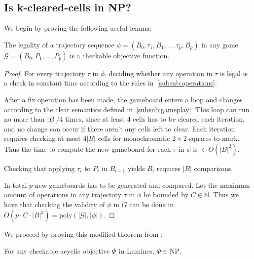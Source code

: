 \subsection{Is k-cleared-cells in NP?}

We begin by proving the following useful lemma:\\

\begin{lem}
\label{lem:legality}
The legality of a trajectory sequence $\phi=(B_0, \tau_1, B_1, \ldots ,\tau_p, B_p)$ in any game $\mathcal{G}=(B_0, P_1, \ldots, P_p)$ is a checkable objective function.
\end{lem}

\begin{proof}
For every trajectory $\tau$ in $\phi$, deciding whether any operation in $\tau$ is legal is a check in constant time according to the rules in~\ref{subsub:operations}.

After a fix operation has been made, the gameboard enters a loop and changes according to the clear semantics defined in~\ref{subsub:gameplay}. This loop can run no more than $|B| / 4$ times, since at least 4 cells has to be cleared each iteration, and no change can occur if there aren't any cells left to clear. Each iteration requires checking at most $4|B|$ cells for monochromatic $2 \times 2$-squares to mark. Thus the time to compute the new gameboard for each $\tau$ in $\phi$ is $\in O(|B|^2)$.

Checking that applying $\tau_i$ to $P_i$ in $B_{i-1}$ yields $B_i$ requires $|B|$ comparisons. 

In total $p$ new gameboards has to be generated and compared. Let the maximum amount of operations in any trajectory $\tau$ in $\phi$ be bounded by $C \in \mathbb{N}$. Thus we have that checking the validity of $\phi$ in $G$ can be done in $O(p \cdot C \cdot |B|^3) = \text{poly}(|\mathcal{G}|, |\phi|)$. 
\end{proof}

We proceed by proving this modified theorem from \citeauthor{tetris} \cite{tetris}: \\

\begin{thm}
\label{thm:npobj}
For any checkable acyclic objective $\Phi$ in Lumines, $\Phi \in \text{NP}$.
\end{thm}


